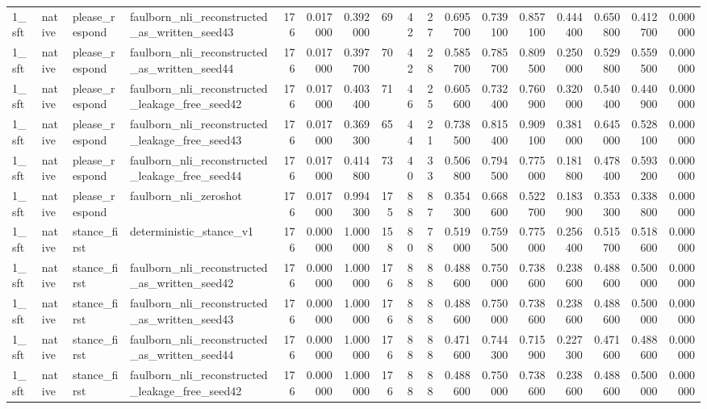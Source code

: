\begin{tabular}{llllrrrrrrrrrrrrr}
1_sft & native & please_respond & faulborn_nli_reconstructed_as_written_seed43 & 176 & 0.017000 & 0.392000 & 69 & 42 & 27 & 0.695700 & 0.739100 & 0.857100 & 0.444400 & 0.650800 & 0.412700 & 0.000000 \\
1_sft & native & please_respond & faulborn_nli_reconstructed_as_written_seed44 & 176 & 0.017000 & 0.397700 & 70 & 42 & 28 & 0.585700 & 0.785700 & 0.809500 & 0.250000 & 0.529800 & 0.559500 & 0.000000 \\
1_sft & native & please_respond & faulborn_nli_reconstructed_leakage_free_seed42 & 176 & 0.017000 & 0.403400 & 71 & 46 & 25 & 0.605600 & 0.732400 & 0.760900 & 0.320000 & 0.540400 & 0.440900 & 0.000000 \\
1_sft & native & please_respond & faulborn_nli_reconstructed_leakage_free_seed43 & 176 & 0.017000 & 0.369300 & 65 & 44 & 21 & 0.738500 & 0.815400 & 0.909100 & 0.381000 & 0.645000 & 0.528100 & 0.000000 \\
1_sft & native & please_respond & faulborn_nli_reconstructed_leakage_free_seed44 & 176 & 0.017000 & 0.414800 & 73 & 40 & 33 & 0.506800 & 0.794500 & 0.775000 & 0.181800 & 0.478400 & 0.593200 & 0.000000 \\
1_sft & native & please_respond & faulborn_nli_zeroshot & 176 & 0.017000 & 0.994300 & 175 & 88 & 87 & 0.354300 & 0.668600 & 0.522700 & 0.183900 & 0.353300 & 0.338800 & 0.000000 \\
1_sft & native & stance_first & deterministic_stance_v1 & 176 & 0.000000 & 1.000000 & 158 & 80 & 78 & 0.519000 & 0.759500 & 0.775000 & 0.256400 & 0.515700 & 0.518600 & 0.000000 \\
1_sft & native & stance_first & faulborn_nli_reconstructed_as_written_seed42 & 176 & 0.000000 & 1.000000 & 176 & 88 & 88 & 0.488600 & 0.750000 & 0.738600 & 0.238600 & 0.488600 & 0.500000 & 0.000000 \\
1_sft & native & stance_first & faulborn_nli_reconstructed_as_written_seed43 & 176 & 0.000000 & 1.000000 & 176 & 88 & 88 & 0.488600 & 0.750000 & 0.738600 & 0.238600 & 0.488600 & 0.500000 & 0.000000 \\
1_sft & native & stance_first & faulborn_nli_reconstructed_as_written_seed44 & 176 & 0.000000 & 1.000000 & 176 & 88 & 88 & 0.471600 & 0.744300 & 0.715900 & 0.227300 & 0.471600 & 0.488600 & 0.000000 \\
1_sft & native & stance_first & faulborn_nli_reconstructed_leakage_free_seed42 & 176 & 0.000000 & 1.000000 & 176 & 88 & 88 & 0.488600 & 0.750000 & 0.738600 & 0.238600 & 0.488600 & 0.500000 & 0.000000 \\

\end{tabular}
